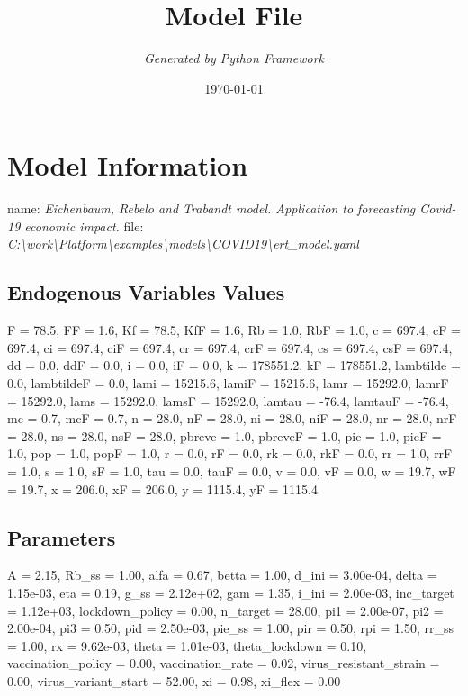 \documentclass{article}%
\title{\textbf{Model File}}%
\author{\textit{Generated by Python Framework}}%
\date{\today}%
\begin{document}
%
\normalsize%
\maketitle%
\section{Model Information}%
\label{sec:ModelInformation}%
name: %
\textit{Eichenbaum, Rebelo and Trabandt model.  Application to forecasting Covid{-}19 economic impact.}%
\newline%
file: %
\textit{C:\textbackslash{}work\textbackslash{}Platform\textbackslash{}examples\textbackslash{}models\textbackslash{}COVID19\textbackslash{}ert\_model.yaml}%
\subsection{Endogenous Variables Values}%
\label{subsec:EndogenousVariablesValues}%
F = 78.5, FF = 1.6, Kf = 78.5, KfF = 1.6, Rb = 1.0, RbF = 1.0, c = 697.4, cF = 697.4, ci = 697.4, ciF = 697.4, cr = 697.4, crF = 697.4, cs = 697.4, csF = 697.4, dd = 0.0, ddF = 0.0, i = 0.0, iF = 0.0, k = 178551.2, kF = 178551.2, lambtilde = 0.0, lambtildeF = 0.0, lami = 15215.6, lamiF = 15215.6, lamr = 15292.0, lamrF = 15292.0, lams = 15292.0, lamsF = 15292.0, lamtau = {-}76.4, lamtauF = {-}76.4, mc = 0.7, mcF = 0.7, n = 28.0, nF = 28.0, ni = 28.0, niF = 28.0, nr = 28.0, nrF = 28.0, ns = 28.0, nsF = 28.0, pbreve = 1.0, pbreveF = 1.0, pie = 1.0, pieF = 1.0, pop = 1.0, popF = 1.0, r = 0.0, rF = 0.0, rk = 0.0, rkF = 0.0, rr = 1.0, rrF = 1.0, s = 1.0, sF = 1.0, tau = 0.0, tauF = 0.0, v = 0.0, vF = 0.0, w = 19.7, wF = 19.7, x = 206.0, xF = 206.0, y = 1115.4, yF = 1115.4

%
\subsection{Parameters}%
\label{subsec:Parameters}%
A = 2.15, Rb\_ss = 1.00, alfa = 0.67, betta = 1.00, d\_ini = 3.00e{-}04, delta = 1.15e{-}03, eta = 0.19, g\_ss = 2.12e+02, gam = 1.35, i\_ini = 2.00e{-}03, inc\_target = 1.12e+03, lockdown\_policy = 0.00, n\_target = 28.00, pi1 = 2.00e{-}07, pi2 = 2.00e{-}04, pi3 = 0.50, pid = 2.50e{-}03, pie\_ss = 1.00, pir = 0.50, rpi = 1.50, rr\_ss = 1.00, rx = 9.62e{-}03, theta = 1.01e{-}03, theta\_lockdown = 0.10, vaccination\_policy = 0.00, vaccination\_rate = 0.02, virus\_resistant\_strain = 0.00, virus\_variant\_start = 52.00, xi = 0.98, xi\_flex = 0.00
\end{document}
